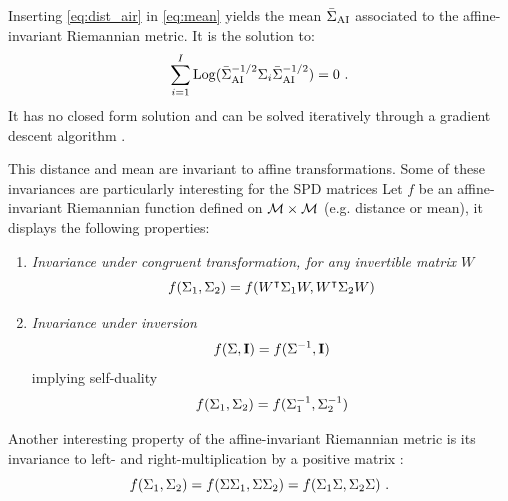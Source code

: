 Inserting \eqref{eq:dist_air} in \eqref{eq:mean} yields the mean $\bar{\Sigma}_{\operatorname{AI}}$ associated to the affine-invariant Riemannian metric. 
It is the solution to:
\begin{equation}
\sum_{\nb=1}^\Nb \Logm(\PmAIRM^{-1/2} \P_\nb \PmAIRM^{-1/2})=0 \ .
\label{mean_air}
\end{equation}
It has no closed form solution and can be solved iteratively through a gradient descent algorithm \cite{fletcher_principal_2004}. 

This distance and mean are invariant to affine transformations. 
Some of these invariances are particularly interesting for the SPD matrices
Let $f$ be an affine-invariant Riemannian function defined on $\mathcal{M} \times \mathcal{M}$ (e.g. distance or mean), it displays the following properties:
\begin{enumerate}[label=(\roman*)]
\item \emph{Invariance under congruent transformation, for any invertible matrix $W$}
\begin{equation}
f(\P_1, \P_2) = f(W^\intercal \P_1 W, W^\intercal \P_2 W)
\label{eq:invar_congr}
\end{equation}
\item \emph{Invariance under inversion}
\begin{equation}
f(\P,\eye) = f(\P^{-1},\eye)
\label{eq:invar_invers}
\end{equation}
implying self-duality
\begin{equation}
f(\P_1,\P_2) = f(\P_1^{-1},\P_2^{-1})
\label{eq:invar_invers2}
\end{equation}
\end{enumerate}
Another interesting property of the affine-invariant Riemannian metric is its invariance to left- and right-multiplication by a positive matrix \cite{arsigny_geometric_2007}:
\begin{equation}
f(\P_1, \P_2) = f(\P \P_1, \P \P_2) = f(\P_1 \P, \P_2 \P) \ .
\label{eq:invar_mult}
\end{equation}

